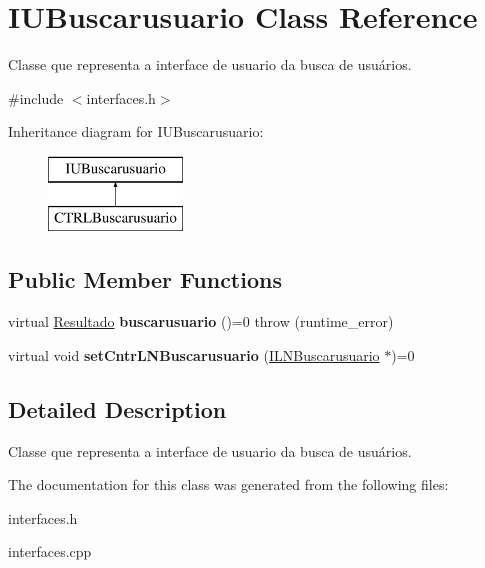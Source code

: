 \hypertarget{classIUBuscarusuario}{}\section{I\+U\+Buscarusuario Class Reference}
\label{classIUBuscarusuario}


Classe que representa a interface de usuario da busca de usuários.  




{\ttfamily \#include $<$interfaces.\+h$>$}

Inheritance diagram for I\+U\+Buscarusuario\+:\begin{figure}[H]
\begin{center}
\leavevmode
\includegraphics[height=2.000000cm]{classIUBuscarusuario}
\end{center}
\end{figure}
\subsection*{Public Member Functions}
\begin{DoxyCompactItemize}
\item 
\mbox{\label{classIUBuscarusuario_a325a581f5e61a973ced408613a12af0e}} 
virtual \hyperlink{classResultado}{Resultado} {\bfseries buscarusuario} ()=0  throw (runtime\+\_\+error)
\item 
\mbox{\label{classIUBuscarusuario_a675ba498ab758ce12532ca228c490781}} 
virtual void {\bfseries set\+Cntr\+L\+N\+Buscarusuario} (\hyperlink{classILNBuscarusuario}{I\+L\+N\+Buscarusuario} $\ast$)=0
\end{DoxyCompactItemize}


\subsection{Detailed Description}
Classe que representa a interface de usuario da busca de usuários. 

The documentation for this class was generated from the following files\+:\begin{DoxyCompactItemize}
\item 
interfaces.\+h\item 
interfaces.\+cpp\end{DoxyCompactItemize}
